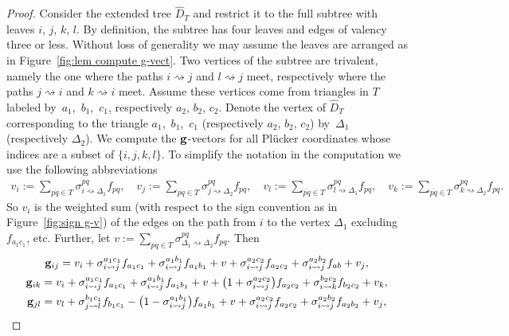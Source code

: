 \documentclass[pdftex]{sigma}%
\numberwithin{equation}{section}
\begin{document}
\begin{proof}
Consider the extended tree $\widehat D_T$ and restrict it to the full subtree with leaves $i$, $j$, $k$, $l$.
By definition, the subtree has four leaves and edges of valency three or less.
Without loss of generality we may assume the leaves are arranged as in Figure~\ref{fig:lem compute g-vect}.
Two vertices of the subtree are trivalent, namely the one where the paths $i\rightsquigarrow j$ and $l\rightsquigarrow j$ meet, respectively where the paths $j\rightsquigarrow i$ and $k\rightsquigarrow i$ meet.
Assume these vertices come from triangles in $T$ labeled by~$a_1$,~$b_1$,~$c_1$, respectively $a_2$, $b_2$, $c_2$.
Denote the vertex of $\widehat{D}_T$ corresponding to the triangle $a_1$,~$b_1$,~$c_1$ (respectively $a_2$, $b_2$, $c_2$) by~$\Delta_1$ (respectively $\Delta_2$).
We compute the ${\bf g}$-vectors for all Pl\"ucker coordinates whose indices are a subset of $\{i,j,k,l\}$.
To simplify the notation in the computation we use the following abbreviations
\begin{gather*}
v_i:= \sum_{\overline{pq}\in T} \sigma_{i\rightsquigarrow \Delta_1}^{pq}f_{pq}, \quad
v_j:= \sum_{\overline{pq}\in T} \sigma_{j\rightsquigarrow \Delta_2}^{pq}f_{pq}, \quad
v_l:= \sum_{\overline{pq}\in T} \sigma_{l\rightsquigarrow \Delta_1}^{pq}f_{pq}, \quad
v_k:= \sum_{\overline{pq}\in T} \sigma_{k\rightsquigarrow \Delta_2}^{pq}f_{pq}.
\end{gather*}
So $v_i$ is the weighted sum (with respect to the sign convention as in Figure~\ref{fig:sign g-v}) of the edges on the path from $i$ to the vertex $\Delta_1$ excluding $f_{a_1c_1}$, etc. Further, let $v:= \sum_{\overline{pq}\in T} \sigma_{\Delta_1\rightsquigarrow \Delta_2}^{pq}f_{pq}$. Then
\begin{gather*}
{\bf g}_{ij} = v_i +\sigma_{i\rightsquigarrow j}^{a_1c_1} f_{a_1c_1}+\sigma_{i\rightsquigarrow j}^{a_1b_1}f_{a_1b_1}+v + \sigma_{i\rightsquigarrow j}^{a_2c_2}f_{a_2c_2} + \sigma_{i\rightsquigarrow j}^{a_2b_2} f_{ab}+v_j,
\\
{\bf g}_{ik} = v_i + \sigma_{i\rightsquigarrow j}^{a_1c_1}f_{a_1c_1} +\sigma_{i\rightsquigarrow j}^{a_1b_1}f_{a_1b_1} + v + \big(1+ \sigma_{i\rightsquigarrow j}^{a_2c_2}\big)f_{a_2c_2} + \sigma_{i\rightsquigarrow k}^{b_2c_2}f_{b_2c_2} + v_k,
\\
{\bf g}_{jl} = v_l + \sigma_{j\rightsquigarrow l}^{b_1c_1}f_{b_1c_1} - \big(1- \sigma_{i\rightsquigarrow j}^{a_1b_1}\big)f_{a_1b_1} + v + \sigma_{i\rightsquigarrow j}^{a_2c_2}f_{a_2c_2} + \sigma_{i\rightsquigarrow j}^{a_2b_2}f_{a_2b_2} + v_j,

\end{gather*}
\end{proof}
\end{document}
